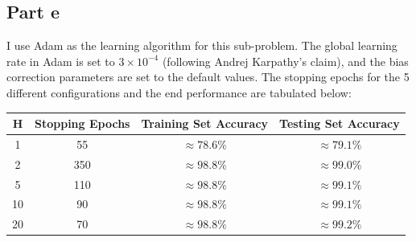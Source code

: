 \documentclass{article}
\begin{document}
\subsection*{Part e}
\begin{flushleft}
I use Adam as the learning algorithm for this sub-problem. The global learning rate in Adam is set to \(3 \times 10^{-4}\) (following Andrej Karpathy's claim), and the bias correction parameters are set to the default values. The stopping epochs for the 5 different configurations and the end performance are tabulated below:
\begin{center}
\begin{tabular}{|c|c|c|c|}
\hline
H & Stopping Epochs & Training Set Accuracy & Testing Set Accuracy \\
\hline
1 & 55 & \(\approx 78.6\%\) & \(\approx 79.1\%\)\\
\hline
2 & 350 & \(\approx 98.8\%\)& \(\approx 99.0\%\)\\
\hline
5 & 110 & \(\approx 98.8\%\)& \(\approx 99.1\%\)\\
\hline
10 & 90 & \(\approx 98.8\%\)& \(\approx 99.1\%\)\\
\hline
20 & 70 & \(\approx 98.8\%\)& \(\approx 99.2\%\)\\
\hline
\end{tabular}
\end{center}


\end{flushleft}
\end{document}

